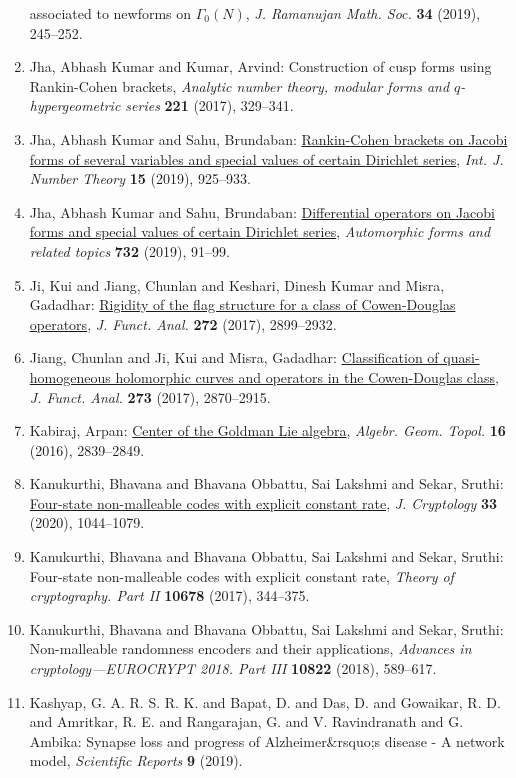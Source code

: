 \begin{enumerate}
associated to newforms on {$\Gamma_0(N)$}, \emph{J. Ramanujan Math. Soc.} {\bf 34} (2019), 245--252.
\item Jha, Abhash Kumar and Kumar, Arvind: Construction of cusp forms using {R}ankin-{C}ohen brackets, \emph{Analytic number theory, modular forms and {$q$}-hypergeometric
series} {\bf 221} (2017), 329--341.
\item Jha, Abhash Kumar and Sahu, Brundaban: \href{https://doi.org/10.1142/S1793042119500490}{Rankin-{C}ohen brackets on {J}acobi forms of several variables
and special values of certain {D}irichlet series}, \emph{Int. J. Number Theory} {\bf 15} (2019), 925--933.
\item Jha, Abhash Kumar and Sahu, Brundaban: \href{https://doi.org/10.1090/conm/732/14793}{Differential operators on {J}acobi forms and special values of
certain {D}irichlet series}, \emph{Automorphic forms and related topics} {\bf 732} (2019), 91--99.
\item Ji, Kui and Jiang, Chunlan and Keshari, Dinesh Kumar and
Misra, Gadadhar: \href{https://doi.org/10.1016/j.jfa.2016.12.019}{Rigidity of the flag structure for a class of
{C}owen-{D}ouglas operators}, \emph{J. Funct. Anal.} {\bf 272} (2017), 2899--2932.
\item Jiang, Chunlan and Ji, Kui and Misra, Gadadhar: \href{https://doi.org/10.1016/j.jfa.2017.06.015}{Classification of quasi-homogeneous holomorphic curves and
operators in the {C}owen-{D}ouglas class}, \emph{J. Funct. Anal.} {\bf 273} (2017), 2870--2915.
\item Kabiraj, Arpan: \href{https://doi.org/10.2140/agt.2016.16.2839}{Center of the {G}oldman {L}ie algebra}, \emph{Algebr. Geom. Topol.} {\bf 16} (2016), 2839--2849.
\item Kanukurthi, Bhavana and Bhavana Obbattu, Sai Lakshmi and
Sekar, Sruthi: \href{https://doi.org/10.1007/s00145-019-09339-7}{Four-state non-malleable codes with explicit constant rate}, \emph{J. Cryptology} {\bf 33} (2020), 1044--1079.
\item Kanukurthi, Bhavana and Bhavana Obbattu, Sai Lakshmi and
Sekar, Sruthi: Four-state non-malleable codes with explicit constant rate, \emph{Theory of cryptography. {P}art {II}} {\bf 10678} (2017), 344--375.
\item Kanukurthi, Bhavana and Bhavana Obbattu, Sai Lakshmi and
Sekar, Sruthi: Non-malleable randomness encoders and their applications, \emph{Advances in cryptology---{EUROCRYPT} 2018. {P}art {III}} {\bf 10822} (2018), 589--617.
\item Kashyap, G. A. R. S. R. K. and Bapat, D. and Das, D. and Gowaikar, R. D. and  Amritkar, R. E. and Rangarajan, G. and V. Ravindranath and G. Ambika: Synapse loss and progress of Alzheimer&rsquo;s disease - A network model, \emph{Scientific Reports} {\bf 9} (2019).

\end{enumerate}
